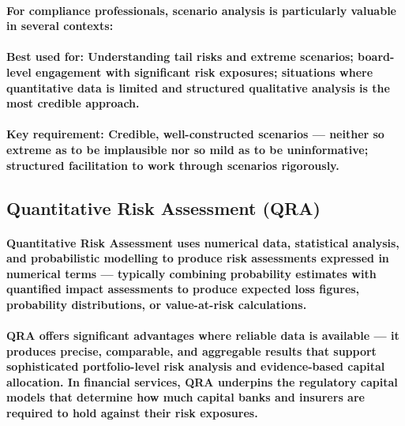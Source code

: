 \paragraph{For compliance professionals, scenario analysis is particularly valuable in several contexts:}
\begin{itemize}
\end{itemize}
\paragraph{\textbf{Best used for}: Understanding tail risks and extreme scenarios; board-level engagement with significant risk exposures; situations where quantitative data is limited and structured qualitative analysis is the most credible approach.}
\paragraph{\textbf{Key requirement}: Credible, well-constructed scenarios — neither so extreme as to be implausible nor so mild as to be uninformative; structured facilitation to work through scenarios rigorously.}

\subsection{Quantitative Risk Assessment (QRA)}
\paragraph{\textbf{Quantitative Risk Assessment} uses numerical data, statistical analysis, and probabilistic modelling to produce risk assessments expressed in numerical terms — typically combining probability estimates with quantified impact assessments to produce expected loss figures, probability distributions, or value-at-risk calculations.}
\paragraph{QRA offers significant advantages where reliable data is available — it produces precise, comparable, and aggregable results that support sophisticated portfolio-level risk analysis and evidence-based capital allocation. In financial services, QRA underpins the regulatory capital models that determine how much capital banks and insurers are required to hold against their risk exposures.}
